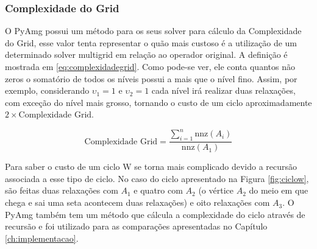 \subsubsection{Complexidade do Grid}
 
O PyAmg possui um método para os seus solver para cálculo da  Complexidade do Grid, esse valor tenta representar o quão mais custoso é a utilização de um determinado solver multigrid em relação ao operador original. A definição é mostrada em \eqref{eq:complexidadegrid}. Como pode-se ver, ele conta quantos não zeros o somatório de todos os níveis possui a mais que o nível fino. Assim, por exemplo, considerando $\upsilon_1=1$ e $\upsilon_2=1$ cada nível irá realizar duas relaxações, com exceção do nível mais grosso, tornando o  custo de um ciclo aproximadamente $2\times\text{Complexidade Grid}$. 

\begin{equation}\label{eq:complexidadegrid}
    \text{Complexidade Grid} = \frac{\sum_{i=1}^n \text{nnz}(A_i)}{\text{nnz}(A_1)}
\end{equation}

Para saber o custo de um ciclo W se torna mais complicado devido a recursão associada a esse tipo de ciclo. No caso do ciclo apresentado na Figura \ref{fig:ciclow}, são feitas duas relaxações com $A_1$ e quatro com $A_2$ (o vértice $A_2$ do meio em que chega e sai uma seta acontecem duas relaxações) e oito relaxações com $A_3$. O PyAmg também tem um método que cálcula a complexidade do ciclo através de recursão e foi utilizado para as comparações apresentadas no Capítulo \ref{ch:implementacao}. 






